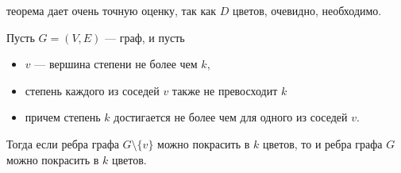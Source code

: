 \begin{notice}
    теорема дает очень точную оценку, так как $D$ цветов, очевидно, необходимо.
\end{notice}

\begin{lemma}
    Пусть $G = (V, E)$ --- граф, и пусть 
    \begin{itemize}
        \item $v$ --- вершина степени не более чем $k$,
        \item степень каждого из соседей $v$ также не превосходит $k$
        \item причем степень $k$ достигается не более чем для одного из соседей $v$.
    \end{itemize}
    Тогда если ребра графа $G \setminus \{v\}$ можно покрасить в $k$ цветов, то и ребра графа $G$ можно покрасить в $k$ цветов.
\end{lemma}

